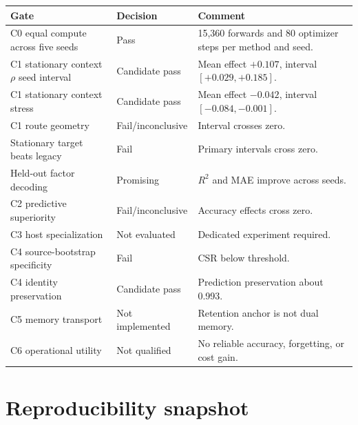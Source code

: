 \documentclass[11pt,a4paper]{article}
\begin{document}
\begin{longtable}{p{}p{}p{}}
\toprule
Gate & Decision & Comment \\
\midrule
C0 equal compute across five seeds & Pass & 15,360 forwards and 80 optimizer steps per method and seed. \\
C1 stationary context $\rho$ seed interval & Candidate pass & Mean effect $+0.107$, interval $[+0.029,+0.185]$. \\
C1 stationary context stress & Candidate pass & Mean effect $-0.042$, interval $[-0.084,-0.001]$. \\
C1 route geometry & Fail/inconclusive & Interval crosses zero. \\
Stationary target beats legacy & Fail & Primary intervals cross zero. \\
Held-out factor decoding & Promising & $R^2$ and MAE improve across seeds. \\
C2 predictive superiority & Fail/inconclusive & Accuracy effects cross zero. \\
C3 host specialization & Not evaluated & Dedicated experiment required. \\
C4 source-bootstrap specificity & Fail & CSR below threshold. \\
C4 identity preservation & Candidate pass & Prediction preservation about 0.993. \\
C5 memory transport & Not implemented & Retention anchor is not dual memory. \\
C6 operational utility & Not qualified & No reliable accuracy, forgetting, or cost gain. \\
\bottomrule
\end{longtable}

\section{Reproducibility snapshot}
\end{document}
